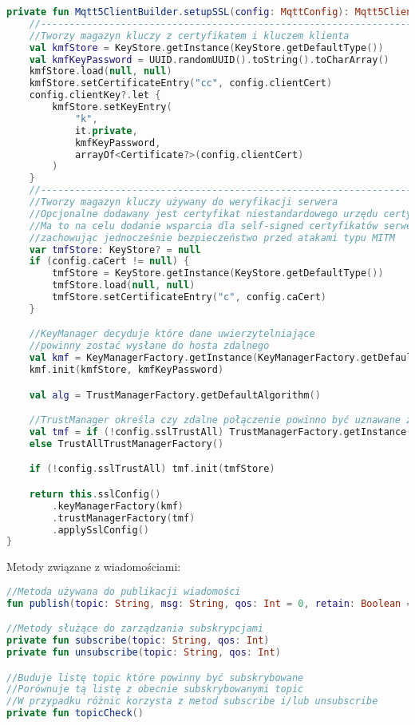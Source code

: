 \begin{lstlisting}[language=Kotlin]
private fun Mqtt5ClientBuilder.setupSSL(config: MqttConfig): Mqtt5ClientBuilder {
    //---------------------------------------------------------------------------
    //Tworzy magazyn kluczy z certyfikatem i kluczem klienta
    val kmfStore = KeyStore.getInstance(KeyStore.getDefaultType())
    val kmfKeyPassword = UUID.randomUUID().toString().toCharArray()
    kmfStore.load(null, null)
    kmfStore.setCertificateEntry("cc", config.clientCert)
    config.clientKey?.let {
        kmfStore.setKeyEntry(
            "k",
            it.private,
            kmfKeyPassword,
            arrayOf<Certificate?>(config.clientCert)
        )
    }
    //---------------------------------------------------------------------------
    //Tworzy magazyn kluczy używany do weryfikacji serwera
    //Opcjonalne dodawany jest certyfikat niestandardowego urzędu certyfikacji
    //Ma to na celu dodanie wsparcia dla self-signed certyfikatów serwera
    //zachowując jednocześnie bezpieczeństwo przed atakami typu MITM
    var tmfStore: KeyStore? = null
    if (config.caCert != null) {
        tmfStore = KeyStore.getInstance(KeyStore.getDefaultType())
        tmfStore.load(null, null)
        tmfStore.setCertificateEntry("c", config.caCert)
    }

    //KeyManager decyduje które dane uwierzytelniające
    //powinny zostać wysłane do hosta zdalnego
    val kmf = KeyManagerFactory.getInstance(KeyManagerFactory.getDefaultAlgorithm())
    kmf.init(kmfStore, kmfKeyPassword)

    val alg = TrustManagerFactory.getDefaultAlgorithm()

    //TrustManager określa czy zdalne połączenie powinno być uznawane za zaufane
    val tmf = if (!config.sslTrustAll) TrustManagerFactory.getInstance(alg)
    else TrustAllTrustManagerFactory()

    if (!config.sslTrustAll) tmf.init(tmfStore)

    return this.sslConfig()
        .keyManagerFactory(kmf)
        .trustManagerFactory(tmf)
        .applySslConfig()
}
\end{lstlisting}

\newpage

Metody związane z wiadomościami:

\begin{lstlisting}[language=Kotlin]
//Metoda używana do publikacji wiadomości
fun publish(topic: String, msg: String, qos: Int = 0, retain: Boolean = false)

//Metody służące do zarządzania subskrypcjami
private fun subscribe(topic: String, qos: Int)
private fun unsubscribe(topic: String, qos: Int)

//Buduje listę topic które powinny być subskrybowane
//Porównuje tą listę z obecnie subskrybowanymi topic
//W przypadku różnic korzysta z metod subscribe i/lub unsubscribe
private fun topicCheck()
\end{lstlisting}

